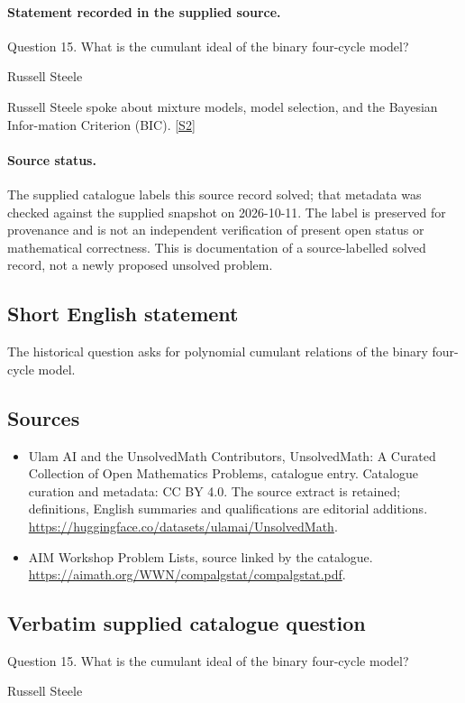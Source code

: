 \documentclass[11pt]{article}
\begin{document}
\paragraph{Statement recorded in the supplied source.}
Question 15. What is the cumulant ideal of the binary four-cycle model?

Russell Steele

Russell Steele spoke about mixture models, model selection, and the Bayesian Infor-mation Criterion (BIC). \href{https://aimath.org/WWN/compalgstat/compalgstat.pdf}{[S2]}
\paragraph{Source status.}
The supplied catalogue labels this source record solved; that metadata was checked against the supplied snapshot on 2026-10-11. The label is preserved for provenance and is not an independent verification of present open status or mathematical correctness. This is documentation of a source-labelled solved record, not a newly proposed unsolved problem.
\subsection{Short English statement}
The historical question asks for polynomial cumulant relations of the binary four-cycle model.
\subsection{Sources}
\begin{itemize}
\item[S1] Ulam AI and the UnsolvedMath Contributors, UnsolvedMath: A Curated Collection of Open Mathematics Problems, catalogue entry. Catalogue curation and metadata: CC BY 4.0. The source extract is retained; definitions, English summaries and qualifications are editorial additions.
\url{https://huggingface.co/datasets/ulamai/UnsolvedMath}.
\item[S2] AIM Workshop Problem Lists, source linked by the catalogue.
\url{https://aimath.org/WWN/compalgstat/compalgstat.pdf}.
\end{itemize}
\subsection{Verbatim supplied catalogue question}
Question 15. What is the cumulant ideal of the binary four-cycle model?

Russell Steele
\end{document}
